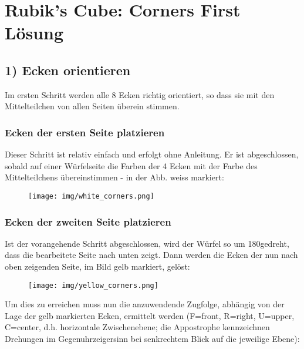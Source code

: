 \documentclass[letterpaper,10pt,twoside,twocolumn,openany]{book}
\begin{document}

\chapter{Rubik's Cube: Corners First Lösung}

\section{1) Ecken orientieren}
\begin{justify}
Im ersten Schritt werden alle 8 Ecken richtig orientiert, so dass sie mit den Mittelteilchen von allen Seiten überein stimmen.
\end{justify}

\subsection{Ecken der ersten Seite platzieren}
\begin{justify}
Dieser Schritt ist relativ einfach und erfolgt ohne Anleitung. Er ist abgeschlossen, sobald auf einer Würfelseite die Farben der 4 Ecken mit der Farbe des Mittelteilchens übereinstimmen - in der Abb. weiss markiert:
\end{justify}

\begin{figure}[!htb] 
  \centering
     \texttt{[image: img/white\_corners.png]}
\end{figure}
\subsection{Ecken der zweiten Seite platzieren}
\begin{justify}
Ist der vorangehende Schritt abgeschlossen, wird der Würfel so um 180\degree gedreht, dass die bearbeitete Seite nach unten zeigt. Dann werden die Ecken der nun nach oben zeigenden Seite, im Bild gelb markiert, gelöst:
\end{justify}

\begin{figure}[!htb] 
  \centering
     \texttt{[image: img/yellow\_corners.png]}
\end{figure}
\begin{justify}
Um dies zu erreichen muss nun die anzuwendende Zugfolge, abhängig von der Lage der gelb markierten Ecken, ermittelt werden (F=front, R=right, U=upper, C=center, d.h. horizontale Zwischenebene; die Appostrophe kennzeichnen Drehungen im Gegenuhrzeigersinn bei senkrechtem Blick auf die jeweilige Ebene):
\end{justify}
\newpage
\end{document}
